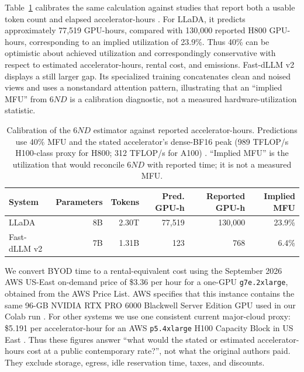 \documentclass{article}
\begin{document}
Table~\ref{tab:compute-calibration} calibrates the same calculation against studies that report both a usable token count and elapsed accelerator-hours \citep{nie2025llada,wu2025fastdllmv2}. For LLaDA, it predicts approximately 77,519 GPU-hours, compared with 130,000 reported H800 GPU-hours, corresponding to an implied utilization of 23.9\%. Thus 40\% can be optimistic about achieved utilization and correspondingly conservative with respect to estimated accelerator-hours, rental cost, and emissions. Fast-dLLM v2 displays a still larger gap. Its specialized training concatenates clean and noised views and uses a nonstandard attention pattern, illustrating that an ``implied MFU'' from $6ND$ is a calibration diagnostic, not a measured hardware-utilization statistic.

\begin{table}[h]
\caption{Calibration of the $6ND$ estimator against reported accelerator-hours. Predictions use 40\% MFU and the stated accelerator's dense-BF16 peak (989 TFLOP/s H100-class proxy for H800; 312 TFLOP/s for A100) \citep{nvidiaH100,nvidiaA100}. ``Implied MFU'' is the utilization that would reconcile $6ND$ with reported time; it is not a measured MFU.}
\label{tab:compute-calibration}
\centering
\small
\begin{tabular}{lrrrrr}
\toprule
System & Parameters & Tokens & Pred. GPU-h & Reported GPU-h & Implied MFU \\
\midrule
LLaDA & 8B & 2.30T & 77,519 & 130,000 & 23.9\% \\
Fast-dLLM v2 & 7B & 1.31B & 123 & 768 & 6.4\% \\
\bottomrule
\end{tabular}
\end{table}

We convert BYOD time to a rental-equivalent cost using the September 2026 AWS US-East on-demand price of \$3.36 per hour for a one-GPU \texttt{g7e.2xlarge}, obtained from the AWS Price List. AWS specifies that this instance contains the same 96-GB NVIDIA RTX PRO 6000 Blackwell Server Edition GPU used in our Colab run \citep{awsPriceListG7e2026,awsG7e2026}. For other systems we use one consistent current major-cloud proxy: \$5.191 per accelerator-hour for an AWS \texttt{p5.4xlarge} H100 Capacity Block in US East \citep{awsCapacity2026}. Thus these figures answer ``what would the stated or estimated accelerator-hours cost at a public contemporary rate?'', not what the original authors paid. They exclude storage, egress, idle reservation time, taxes, and discounts.
\end{document}
